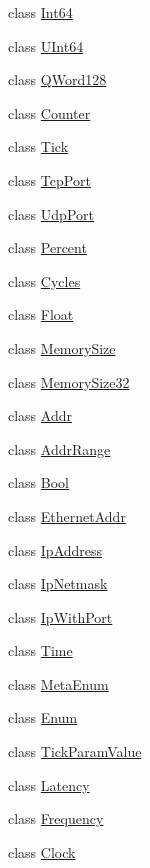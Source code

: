 \begin{DoxyCompactItemize}
class \hyperlink{classm5_1_1params_1_1Int64}{Int64}
\item 
class \hyperlink{classm5_1_1params_1_1UInt64}{UInt64}
\item 
class \hyperlink{classm5_1_1params_1_1QWord128}{QWord128}
\item 
class \hyperlink{classm5_1_1params_1_1Counter}{Counter}
\item 
class \hyperlink{classm5_1_1params_1_1Tick}{Tick}
\item 
class \hyperlink{classm5_1_1params_1_1TcpPort}{TcpPort}
\item 
class \hyperlink{classm5_1_1params_1_1UdpPort}{UdpPort}
\item 
class \hyperlink{classm5_1_1params_1_1Percent}{Percent}
\item 
class \hyperlink{classm5_1_1params_1_1Cycles}{Cycles}
\item 
class \hyperlink{classm5_1_1params_1_1Float}{Float}
\item 
class \hyperlink{classm5_1_1params_1_1MemorySize}{MemorySize}
\item 
class \hyperlink{classm5_1_1params_1_1MemorySize32}{MemorySize32}
\item 
class \hyperlink{classm5_1_1params_1_1Addr}{Addr}
\item 
class \hyperlink{classm5_1_1params_1_1AddrRange}{AddrRange}
\item 
class \hyperlink{classm5_1_1params_1_1Bool}{Bool}
\item 
class \hyperlink{classm5_1_1params_1_1EthernetAddr}{EthernetAddr}
\item 
class \hyperlink{classm5_1_1params_1_1IpAddress}{IpAddress}
\item 
class \hyperlink{classm5_1_1params_1_1IpNetmask}{IpNetmask}
\item 
class \hyperlink{classm5_1_1params_1_1IpWithPort}{IpWithPort}
\item 
class \hyperlink{classm5_1_1params_1_1Time}{Time}
\item 
class \hyperlink{classm5_1_1params_1_1MetaEnum}{MetaEnum}
\item 
class \hyperlink{classm5_1_1params_1_1Enum}{Enum}
\item 
class \hyperlink{classm5_1_1params_1_1TickParamValue}{TickParamValue}
\item 
class \hyperlink{classm5_1_1params_1_1Latency}{Latency}
\item 
class \hyperlink{classm5_1_1params_1_1Frequency}{Frequency}
\item 
class \hyperlink{classm5_1_1params_1_1Clock}{Clock}

\end{DoxyCompactItemize}
